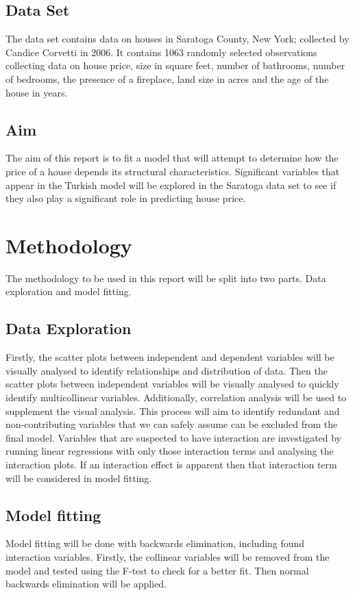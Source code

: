 \documentclass[10pt,A4,makeidx]{article}
\begin{document}
  \subsection{Data Set}
  The data set contains data on houses in Saratoga County, New York; collected by
  Candice Corvetti in 2006. It contains 1063 randomly selected observations collecting
  data on house price, size in square feet, number of bathrooms, number of bedrooms,
  the presence of a fireplace, land size in acres and the age of the house in years.
  
  \subsection{Aim}
  The aim of this report is to fit a model that will attempt to determine how 
  the price of a house depends its structural characteristics. Significant 
  variables that appear in the Turkish model will be explored in the Saratoga 
  data set to see if they also play a significant role in predicting house price.

\section{Methodology}
The methodology to be used in this report will be split into two parts. Data
exploration and model fitting.
  \subsection{Data Exploration}
  Firstly, the scatter plots between independent and dependent variables will be 
  visually analysed to identify relationships and distribution of data. Then the 
  scatter plots between independent variables will be visually analysed to quickly 
  identify multicollinear variables. Additionally, correlation analysis will be used to 
  supplement the visual analysis. This process will aim to identify redundant and 
  non-contributing variables that we can safely assume can be excluded from the 
  final model.  
  Variables that are suspected to have interaction are investigated by running linear 
  regressions with only those interaction terms and analysing the interaction plots.
  If an interaction effect is apparent then that interaction term will be considered
  in model fitting.
  \subsection{Model fitting}
  Model fitting will be done with backwards elimination, including found interaction 
  variables. Firstly, the collinear variables will be removed from the model and 
  tested using the F-test to check for a better fit. Then normal backwards elimination 
  will be applied.
\end{document}
